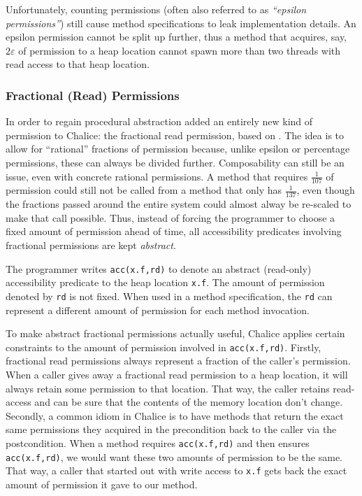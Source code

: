 Unfortunately, counting permissions (often also referred to as \emph{``epsilon permissions''}) still cause method specifications to leak implementation details. 
An epsilon permission cannot be split up further, thus a method that acquires, say, $2 \varepsilon$ of permission to a heap location cannot spawn more than two threads with read access to that heap location.

\subsubsection{Fractional (Read) Permissions}
In order to regain procedural abstraction \cite{HLMS11} added an entirely new kind of permission to Chalice: the fractional read permission, based on \cite{Boy03}. 
The idea is to allow for ``rational'' fractions of permission because, unlike epsilon or percentage permissions, these can always be divided further. 
Composability can still be an issue, even with concrete rational permissions. 
A method that requires $\tfrac{1}{107}$ of permission could still not be called from a method that only has $\tfrac{1}{137}$, even though the fractions passed around the entire system could almost alway be re-scaled to make that call possible.
Thus, instead of forcing the programmer to choose a fixed amount of permission ahead of time, all accessibility predicates involving fractional permissions are kept \emph{abstract}.

The programmer writes \lstinline!acc(x.f,rd)! to denote an abstract (read-only) accessibility predicate to the heap location \lstinline!x.f!. 
The amount of permission denoted by \lstinline!rd! is not fixed. 
When used in a method specification, the \lstinline!rd! can represent a different amount of permission for each method invocation.

To make abstract fractional permissions actually useful, Chalice applies certain constraints to the amount of permission involved in \lstinline!acc(x.f,rd)!. 
Firstly, fractional read permissions always represent a fraction of the caller's permission. 
When a caller gives away a fractional read permission to a heap location, it will always retain some permission to that location. 
That way, the caller retains read-access and can be sure that the contents of the memory location don't change.
Secondly, a common idiom in Chalice is to have methods that return the exact same permissions they acquired in the precondition back to the caller via the postcondition.
When a method requires \lstinline!acc(x.f,rd)! and then ensures \lstinline!acc(x.f,rd)!, we would want these two amounts of permission to be the same. 
That way, a caller that started out with write access to \lstinline!x.f! gets back the exact amount of permission it gave to our method.

